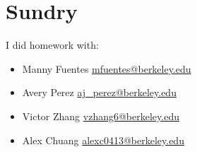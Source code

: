 \documentclass{article}
\begin{document}
\section{Sundry}

I did homework with:
\begin{itemize}
    \item Manny Fuentes \href{mailto:mfuentes@berkeley.edu}{mfuentes@berkeley.edu}
    \item Avery Perez \href{mailto:aj_perez@berkeley.edu}{aj\_perez@berkeley.edu}
    \item Victor Zhang \href{mailto:vzhang6@berkeley.edu}{vzhang6@berkeley.edu}
    \item Alex Chuang \href{mailto:alexc0413@berkeley.edu}{alexc0413@berkeley.edu}
\end{itemize}
\end{document}
